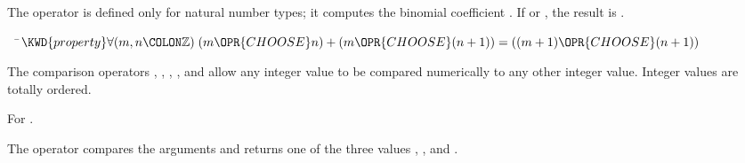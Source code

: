 
The  operator is defined only for natural number types;
it computes the binomial coefficient .
If  or , the result is .

\begin{Fortress}
{\tt~~}\pushtabs\=\+\(  \KWD{property} \forall (m,n\COLON \mathbb{Z})\; (m \OPR{CHOOSE} n) + (m \OPR{CHOOSE} (n+1)) = ((m+1) \OPR{CHOOSE} (n+1))\)\-\\\poptabs
\end{Fortress}





The comparison operators \EXP{<}, \EXP{\leq}, \EXP{=}, \EXP{\geq}, and \EXP{>}
allow any integer value to be compared numerically to any other integer value.
Integer values are totally ordered.

For \EXP{\neq} .



The  operator compares the arguments and returns one of the three values
, , and .




